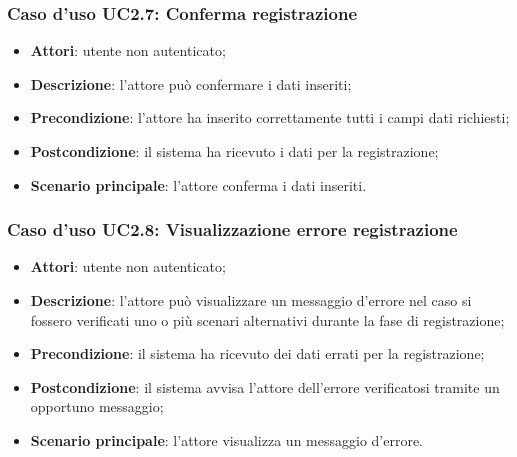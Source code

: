 \subsubsection{Caso d'uso UC2.7: Conferma registrazione}
\begin{itemize}
\item \textbf{Attori}: utente non autenticato;
\item \textbf{Descrizione}: l'attore può confermare i dati inseriti;
\item \textbf{Precondizione}: l'attore ha inserito correttamente tutti i campi dati richiesti;
\item \textbf{Postcondizione}: il sistema ha ricevuto i dati per la registrazione;
\item \textbf{Scenario principale}: l'attore conferma i dati inseriti.
\end{itemize}

\subsubsection{Caso d'uso UC2.8: Visualizzazione errore registrazione}
\begin{itemize}
\item \textbf{Attori}: utente non autenticato;
\item \textbf{Descrizione}: l'attore può visualizzare un messaggio d'errore nel caso si fossero verificati uno o più scenari alternativi durante la fase di registrazione;
\item \textbf{Precondizione}: il sistema ha ricevuto dei dati errati per la registrazione;
\item \textbf{Postcondizione}: il sistema avvisa l'attore dell'errore verificatosi tramite un opportuno messaggio;
\item \textbf{Scenario principale}: l'attore visualizza un messaggio d'errore.
\end{itemize}
